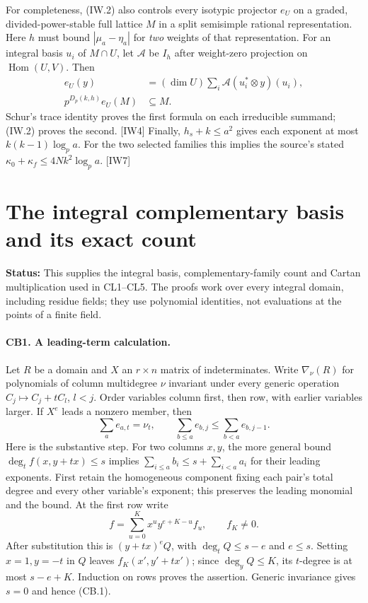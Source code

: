 \documentclass[11pt,a4paper]{article}
\numberwithin{equation}{section}
\theoremstyle{remark}\newtheorem{remark}[theorem]{Remark}
\newcommand{\status}[1]{\textbf{Status:} #1}
\begin{document}
For completeness, (IW.2) also controls every isotypic projector $e_U$ on a graded, divided-power-stable full lattice $M$ in a split semisimple rational representation.
Here $h$ must bound $|\mu_a-\eta_a|$ for \emph{two} weights of that representation.
For an integral basis $u_i$ of $M\cap U$, let $\mathcal A$ be $I_h$ after weight-zero projection on $\operatorname{Hom}(U,V)$.
Then
\[
 \begin{aligned}
 e_U(y)&=(\dim U)\sum_i\mathcal A(u_i^*\otimes y)(u_i),\\
 p^{D_p(k,h)}e_U(M)&\subseteq M.
 \end{aligned}\tag{IW.7}
\]
Schur's trace identity proves the first formula on each irreducible summand; (IW.2) proves the second. \textsf{[IW4]}
Finally, $h_s+k\le a^2$ gives each exponent at most $k(k-1)\log_p a$.
For the two selected families this implies the source's stated $\kappa_0+\kappa_f\le4Nk^2\log_p a$. \textsf{[IW7]}

\section{The integral complementary basis and its exact count}
\label{sec:complementary-basis}

\status{This supplies the integral basis, complementary-family count and Cartan multiplication used in CL1--CL5. The proofs work over every integral domain, including residue fields; they use polynomial identities, not evaluations at the points of a finite field.}

\paragraph{CB1. A leading-term calculation.}\cite{complement-basis}
Let $R$ be a domain and $X$ an $r\times n$ matrix of indeterminates.
Write $\nabla_\nu(R)$ for polynomials of column multidegree $\nu$ invariant under every generic operation $C_j\mapsto C_j+tC_l$, $l<j$.
Order variables column first, then row, with earlier variables larger.
If $X^e$ leads a nonzero member, then
\[
 \sum_a e_{a,t}=\nu_t,\qquad
 \sum_{b\le a}e_{b,j}\le\sum_{b<a}e_{b,j-1}. \tag{CB.1}
\]
Here is the substantive step. For two columns $x,y$, the more general bound
$\deg_t f(x,y+tx)\le s$ implies
$\sum_{i\le a}b_i\le s+\sum_{i<a}a_i$ for their leading exponents.
First retain the homogeneous component fixing each pair's total degree and every other variable's exponent; this preserves the leading monomial and the bound.
At the first row write
\[
 f=\sum_{u=0}^{K}x^uy^{e+K-u}f_u,\qquad f_K\ne0.
\]
After substitution this is $(y+tx)^eQ$, with
$\deg_tQ\le s-e$ and $e\le s$.
Setting $x=1,y=-t$ in $Q$ leaves $f_K(x',y'+tx')$; since $\deg_yQ\le K$, its $t$-degree is at most $s-e+K$.
Induction on rows proves the assertion. Generic invariance gives $s=0$ and hence (CB.1).
\end{document}
